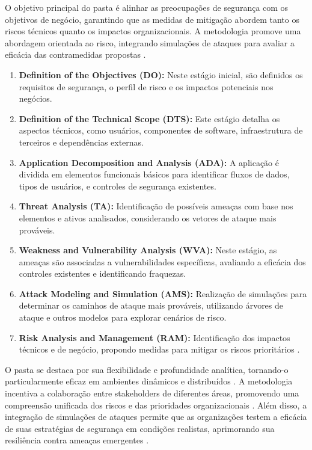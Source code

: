 O objetivo principal do \gls{pasta} é alinhar as preocupações de segurança
com os objetivos de negócio, garantindo que as medidas de mitigação
abordem tanto os riscos técnicos quanto os impactos organizacionais.
A metodologia promove uma abordagem orientada ao risco, integrando
simulações de ataques para avaliar a eficácia das contramedidas
propostas \cite{RiskCentricThreatModeling}.

\begin{enumerate}
    \item \textbf{Definition of the Objectives (DO):} Neste estágio
inicial, são definidos os requisitos de segurança, o perfil de risco e
os impactos potenciais nos negócios.
    \item \textbf{Definition of the Technical Scope (DTS):} Este
estágio detalha os aspectos técnicos, como usuários, componentes de
software, infraestrutura de terceiros e dependências externas.
    \item \textbf{Application Decomposition and Analysis (ADA):} A
aplicação é dividida em elementos funcionais básicos para identificar
fluxos de dados, tipos de usuários, e controles de segurança
existentes.
    \item \textbf{Threat Analysis (TA):} Identificação de possíveis
ameaças com base nos elementos e ativos analisados, considerando os
vetores de ataque mais prováveis.
    \item \textbf{Weakness and Vulnerability Analysis (WVA):} Neste
estágio, as ameaças são associadas a vulnerabilidades específicas,
avaliando a eficácia dos controles existentes e identificando
fraquezas.
    \item \textbf{Attack Modeling and Simulation (AMS):} Realização de
simulações para determinar os caminhos de ataque mais prováveis,
utilizando árvores de ataque e outros modelos para explorar cenários
de risco.
    \item \textbf{Risk Analysis and Management (RAM):} Identificação
dos impactos técnicos e de negócio, propondo medidas para mitigar os
riscos prioritários \cite{RiskCentricThreatModeling}.
\end{enumerate}

O \gls{pasta} se destaca por sua flexibilidade e profundidade analítica,
tornando-o particularmente eficaz em ambientes dinâmicos e
distribuídos \cite{ThreatModelingASystematicLiteratureReview}.
A metodologia incentiva a colaboração entre stakeholders
de diferentes áreas, promovendo uma compreensão unificada dos riscos e
das prioridades organizacionais \cite{ParticipatoryThreatModelling}.
Além disso, a integração de simulações de ataques permite
que as organizações testem a eficácia de suas estratégias de segurança
em condições realistas, aprimorando sua resiliência contra ameaças emergentes
\cite{RiskCentricThreatModeling}.


